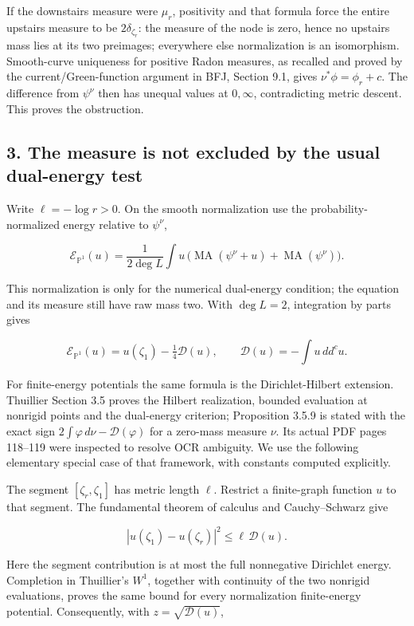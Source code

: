 \documentclass[
  11pt,
]{article}
\begin{document}
If the downstairs measure were \(\mu_r\), positivity and that formula
force the entire upstairs measure to be \(2\delta_{\zeta_r}\): the
measure of the node is zero, hence no upstairs mass lies at its two
preimages; everywhere else normalization is an isomorphism. Smooth-curve
uniqueness for positive Radon measures, as recalled and proved by the
current/Green-function argument in BFJ, Section 9.1, gives
\(\nu^*\phi=\phi_r+c\). The difference from \(\psi^\nu\) then has
unequal values at \(0,\infty\), contradicting metric descent. This
proves the obstruction.

\subsection{3. The measure is not excluded by the usual dual-energy
test}\label{the-measure-is-not-excluded-by-the-usual-dual-energy-test}

Write \(\ell=-\log r>0\). On the smooth normalization use the
probability-normalized energy relative to \(\psi^\nu\),

\[
\mathcal E_{\mathbb P^1}(u)
=\frac1{2\deg L}\int u\,
 \bigl(\operatorname{MA}(\psi^\nu+u)+\operatorname{MA}(\psi^\nu)\bigr).
\]

This normalization is only for the numerical dual-energy condition; the
equation and its measure still have raw mass two. With \(\deg L=2\),
integration by parts gives

\[
\mathcal E_{\mathbb P^1}(u)=u(\zeta_1)-\tfrac14\mathcal D(u),
\qquad \mathcal D(u)=-\int u\,dd^c u.
\]

For finite-energy potentials the same formula is the Dirichlet-Hilbert
extension. Thuillier Section 3.5 proves the Hilbert realization, bounded
evaluation at nonrigid points and the dual-energy criterion; Proposition
3.5.9 is stated with the exact sign
\(2\int\varphi\,d\nu-\mathcal D(\varphi)\) for a zero-mass measure
\(\nu\). Its actual PDF pages 118--119 were inspected to resolve OCR
ambiguity. We use the following elementary special case of that
framework, with constants computed explicitly.

The segment \([\zeta_r,\zeta_1]\) has metric length \(\ell\). Restrict a
finite-graph function \(u\) to that segment. The fundamental theorem of
calculus and Cauchy--Schwarz give

\[
|u(\zeta_1)-u(\zeta_r)|^2\leq\ell\,\mathcal D(u).
\]

Here the segment contribution is at most the full nonnegative Dirichlet
energy. Completion in Thuillier's \(W^1\), together with continuity of
the two nonrigid evaluations, proves the same bound for every
normalization finite-energy potential. Consequently, with
\(z=\sqrt{\mathcal D(u)}\),
\end{document}
